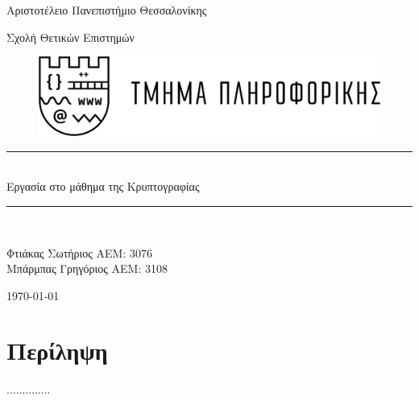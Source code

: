 \documentclass[12pt]{article}
\numberwithin{equation}{section}
\newcommand\blankpage{%
	\null
	\thispagestyle{empty}%
	\addtocounter{page}{-1}%
	\newpage}
\newcommand{\HRule}{\rule{\linewidth}{0.5mm}}
\begin{document}
	\begin{titlepage}
		
		{\LARGE Αριστοτέλειο Πανεπιστήμιο Θεσσαλονίκης}
		\begin{center} {\Large Σχολή Θετικών Επιστημών} \end{center}
		\begin{figure}[h]
			\raggedright
			\hspace{90pt}
			\includegraphics[width=0.5\linewidth]{logo.png}
		\end{figure}
		\begin{center}
			
			
			\begin{figure}[h]
				\centering 
			\end{figure}
			\begin{center}
				
				\HRule \\[0.4cm]
				{\huge Εργασία στο μάθημα της Κρυπτογραφίας}
				
				\HRule \\[0.4cm]
			\end{center}
			
			\vfill
			\begin{doublespacing}
				
				{\LARGE 
					Φτιάκας Σωτήριος ΑΕΜ: 3076\\}
				{\LARGE 
					Μπάρμπας Γρηγόριος ΑΕΜ: 3108\\}
				
				
				\vfill 
				{\Large \today}
			\end{doublespacing}
		\end{center}
	\end{titlepage}
	
	
	\tableofcontents
	
	\clearpage
	
	
	\section*{{\color{maroon}Περίληψη}}
	
	..............
	\blankpage
	
\end{document}
